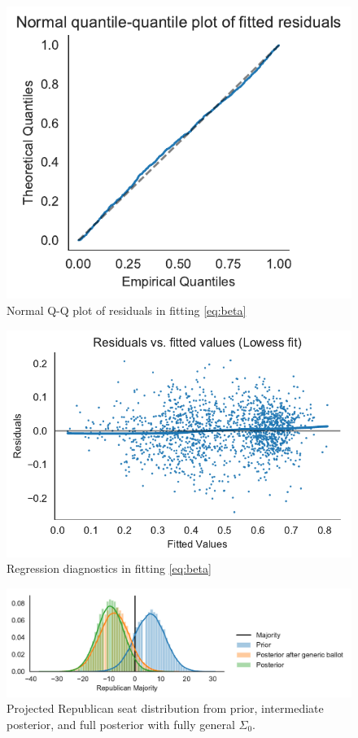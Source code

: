 \documentclass[11pt]{article}
\begin{document}
\begin{figure}[tbh]
  \centering
  \includegraphics{qq.pdf}
  \caption{Normal Q-Q plot of residuals in fitting \eqref{eq:beta}}
  \label{fig:qq}
\end{figure}

\begin{figure}[tbh]
  \centering
  \includegraphics{diagnostics.pdf}
  \caption{Regression diagnostics in fitting \eqref{eq:beta}}
  \label{fig:diag}
\end{figure}

\begin{figure}[tbh]
  \centering
  \includegraphics[width=\textwidth]{rep_seats.pdf}
  \caption{Projected Republican seat distribution from prior, intermediate
  posterior, and full posterior with fully general $\Sigma_0$.}
  \label{fig:hists}
\end{figure}
\end{document}
